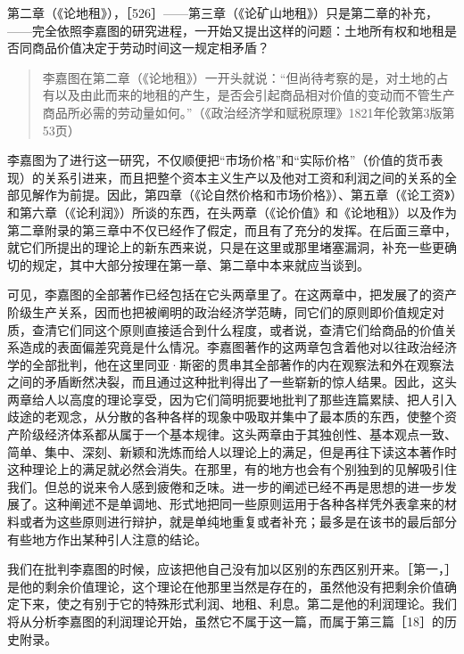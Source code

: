 第二章（《论地租》），［526］——第三章（《论矿山地租》）只是第二章的补充，——完全依照李嘉图的研究进程，一开始又提出这样的问题：土地所有权和地租是否同商品价值决定于劳动时间这一规定相矛盾？

\begin{quote}{李嘉图在第二章（《论地租》）一开头就说：“但尚待考察的是，对土地的占有以及由此而来的地租的产生，是否会引起商品相对价值的变动而不管生产商品所必需的劳动量如何。”（《政治经济学和赋税原理》1821年伦敦第3版第53页）}\end{quote}

李嘉图为了进行这一研究，不仅顺便把“市场价格”和“实际价格”（价值的货币表现）的关系引进来，而且把整个资本主义生产以及他对工资和利润之间的关系的全部见解作为前提。因此，第四章（《论自然价格和市场价格》）、第五章（《论工资》）和第六章（《论利润》）所谈的东西，在头两章（《论价值》和《论地租》）以及作为第二章附录的第三章中不仅已经作了假定，而且有了充分的发挥。在后面三章中，就它们所提出的理论上的新东西来说，只是在这里或那里堵塞漏洞，补充一些更确切的规定，其中大部分按理在第一章、第二章中本来就应当谈到。

可见，李嘉图的全部著作已经包括在它头两章里了。在这两章中，把发展了的资产阶级生产关系，因而也把被阐明的政治经济学范畴，同它们的原则即价值规定对质，查清它们同这个原则直接适合到什么程度，或者说，查清它们给商品的价值关系造成的表面偏差究竟是什么情况。李嘉图著作的这两章包含着他对以往政治经济学的全部批判，他在这里同亚·斯密的贯串其全部著作的内在观察法和外在观察法之间的矛盾断然决裂，而且通过这种批判得出了一些崭新的惊人结果。因此，这头两章给人以高度的理论享受，因为它们简明扼要地批判了那些连篇累牍、把人引入歧途的老观念，从分散的各种各样的现象中吸取并集中了最本质的东西，使整个资产阶级经济体系都从属于一个基本规律。这头两章由于其独创性、基本观点一致、简单、集中、深刻、新颖和洗炼而给人以理论上的满足，但是再往下读这本著作时这种理论上的满足就必然会消失。在那里，有的地方也会有个别独到的见解吸引住我们。但总的说来令人感到疲倦和乏味。进一步的阐述已经不再是思想的进一步发展了。这种阐述不是单调地、形式地把同一些原则运用于各种各样凭外表拿来的材料或者为这些原则进行辩护，就是单纯地重复或者补充；最多是在该书的最后部分有些地方作出某种引人注意的结论。

我们在批判李嘉图的时候，应该把他自己没有加以区别的东西区别开来。［第一，］是他的剩余价值理论，这个理论在他那里当然是存在的，虽然他没有把剩余价值确定下来，使之有别于它的特殊形式利润、地租、利息。第二是他的利润理论。我们将从分析李嘉图的利润理论开始，虽然它不属于这一篇，而属于第三篇［18］的历史附录。


